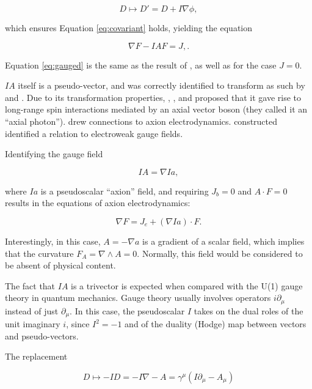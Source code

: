 \documentclass{article}
\begin{document}
  \begin{equation}
    D \mapsto D' = D + I \nabla \phi,
  \end{equation}

  which ensures Equation \ref{eq:covariant} holds, yielding the equation

  \begin{equation}
    \nabla F - I A F = J,\label{eq:gauged}.
  \end{equation}

  Equation \ref{eq:gauged} is the same as the result of \cite{tiwari}, as well as \cite{malik} for the case $J=0$.

  $IA$ itself is a pseudo-vector, and was correctly identified to transform as such by \cite{malik} and \cite{tiwari}. Due to its transformation properties, \cite{malik}, \cite{naik}, and \cite{pmn} proposed that it gave rise to long-range spin interactions mediated by an axial vector boson (they called it an ``axial photon''). \cite{tiwari}  drew connections to axion electrodynamics. \cite{vasconcellos} constructed identified a relation to electroweak gauge fields.

  Identifying the gauge field

  \begin{equation}
    IA = \nabla I a,
  \end{equation}

  where $Ia$ is a pseudoscalar ``axion'' field, and requiring $J_b = 0$ and $A \cdot F = 0$ results in the equations of axion electrodynamics:

  \begin{equation}
    \nabla F = J_e + (\nabla I a) \cdot F.
  \end{equation}

  Interestingly, in this case, $A = -\nabla a$ is a gradient of a scalar field, which implies that the curvature $F_A = \nabla \wedge A = 0$. Normally, this field would be considered to be absent of physical content. 

  The fact that $IA$ is a trivector is expected when compared with the U(1) gauge theory in quantum mechanics. Gauge theory usually involves operators $i \partial_\mu$ instead of just $\partial_\mu$. In this case, the pseudoscalar $I$ takes on the dual roles of the unit imaginary $i$, since $I^2 = -1$ and of the duality (Hodge) map between vectors and pseudo-vectors.

  The replacement 

  \begin{equation}
    D \mapsto - I D = -I \nabla - A = \gamma^\mu (I \partial_\mu - A_\mu)
  \end{equation}
\end{document}
